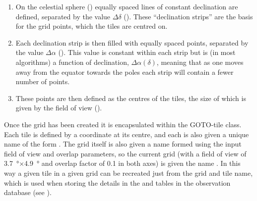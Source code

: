 \begin{colsection}
\begin{enumerate}
    \item On the celestial sphere () equally spaced lines of constant declination are defined, separated by the value $\Delta\delta$ (). These ``declination strips'' are the basis for the grid points, which the tiles are centred on.
    \item Each declination strip is then filled with equally spaced points, separated by the value $\Delta\alpha$ (). This value is constant within each strip but is (in most algorithms) a function of declination, $\Delta\alpha(\delta)$, meaning that as one moves away from the equator towards the poles each strip will contain a fewer number of points.
    \item These points are then defined as the centres of the tiles, the size of which is given by the field of view ().
\end{enumerate}

Once the grid has been created it is encapsulated within the GOTO-tile  class. Each tile is defined by a coordinate at its centre, and each is also given a unique name of the form . The grid itself is also given a name formed using the input field of view and overlap parameters, so the current grid (with a field of view of \SI{3.7}{\degree}$\times$\SI{4.9}{\degree} and overlap factor of 0.1 in both axes) is given the name . In this way a given tile in a given grid can be recreated just from the grid and tile name, which is used when storing the details in the  and  tables in the observation database (see ). %

\newpage

\makeatletter
\setlength{\@fptop}{0pt}
\makeatother


\end{colsection}
